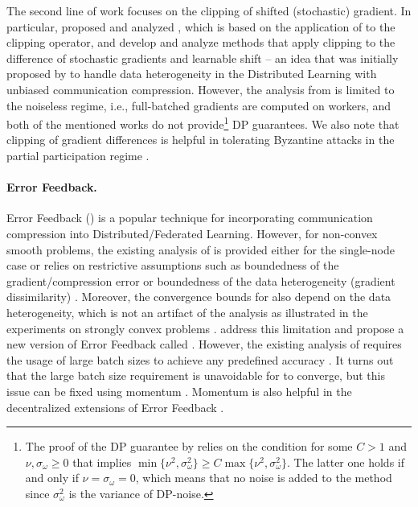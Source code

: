 The second line of work focuses on the clipping of shifted (stochastic) gradient. In particular, \citet{khirirat2023clip21} proposed and analyzed , which is based on the application of  \citep{richtarik2021ef21} to the clipping operator, and \citet{gorbunov2024high} develop and analyze methods that apply clipping to the difference of stochastic gradients and learnable shift -- an idea that was initially proposed by \citet{mishchenko2019distributed} to handle data heterogeneity in the Distributed Learning with unbiased communication compression. However, the analysis from \citep{khirirat2023clip21} is limited to the noiseless regime, i.e., full-batched gradients are computed on workers, and both of the mentioned works do not provide\footnote{The proof of the DP guarantee by \citet{khirirat2023clip21} relies on the condition for some $C > 1$ and $\nu, \sigma_\omega \geq 0$ that implies $\min\{\nu^2, \sigma_\omega^2\} \geq C \max\{\nu^2, \sigma_\omega^2\}$. The latter one holds if and only if $\nu = \sigma_\omega = 0$, which means that no noise is added to the method since $\sigma_\omega^2$ is the variance of DP-noise.} DP guarantees. We also note that clipping of gradient differences is helpful in tolerating Byzantine attacks in the partial participation regime \citep{malinovsky2023byzantine}.



\paragraph{Error Feedback.} Error Feedback () \citep{seide20141} is a popular technique for incorporating communication compression into Distributed/Federated Learning. However, for non-convex smooth problems, the existing analysis of  is provided either for the single-node case or relies on restrictive assumptions such as boundedness of the gradient/compression error or boundedness of the data heterogeneity (gradient dissimilarity) \citep{stich2018sparsified, stich2019error, karimireddy2019error, koloskova2019decentralized, beznosikov2023biased, tang2019doublesqueeze, xie2020cser, sahu2021rethinking}. Moreover, the convergence bounds for  also depend on the data heterogeneity, which is not an artifact of the analysis as illustrated in the experiments on strongly convex problems \citet{gorbunov2020linearly}. \citet{richtarik2021ef21} address this limitation and propose a new version of Error Feedback called . However, the existing analysis of  requires the usage of large batch sizes to achieve any predefined accuracy \citep{fatkhullin2021ef21}. It turns out that the large batch size requirement is unavoidable for  to converge, but this issue can be fixed using momentum \citep{fatkhullin2024momentum}. Momentum is also helpful in the decentralized extensions of Error Feedback \citep{yau2022docom, huang2023stochastic, islamov2024near}.